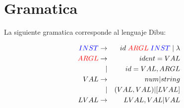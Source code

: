 \documentclass{article}
\theoremstyle{definition}
\theoremstyle{remark}
\begin{document}
{} %

 
 
\maketitle

\tableofcontents

\section{Gramatica}

La siguiente gramatica corresponde al lenguaje Dibu:

\begin{equation}
\begin{aligned}
\textcolor{blue}{INST} & \rightarrow & id \; \textcolor{red}{ARGL} \; \textcolor{blue}{INST}  \; | \; \lambda \\
\textcolor{red}{ARGL} & \rightarrow & ident = VAL \\
     & \quad | &  id = VAL, ARGL \\
VAL  & \rightarrow & num | string \\
     & \quad | & (VAL, VAL) | [LVAL] \\
LVAL & \rightarrow & LVAL, VAL | VAL
\end{aligned}
\end{equation}
\end{document}
